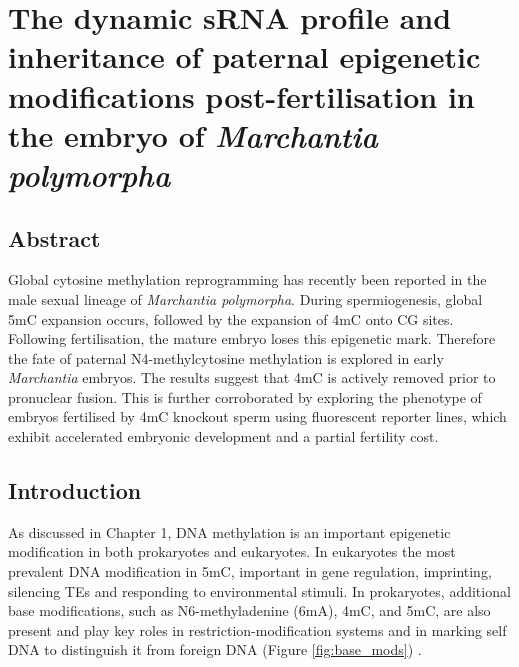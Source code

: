 \chapter{The dynamic sRNA profile and inheritance of paternal epigenetic modifications post-fertilisation in the embryo of \textit{Marchantia polymorpha}}

\ifpdf
    \graphicspath{{Chapter3/Figs/Raster/}{Chapter3/Figs/PDF/}{Chapter3/Figs/}}
\else
    \graphicspath{{Chapter3/Figs/Vector/}{Chapter3/Figs/}}
\fi


\section{Abstract}

Global cytosine methylation reprogramming has recently been reported in the male sexual lineage of \textit{Marchantia polymorpha}. During spermiogenesis, global 5mC expansion occurs, followed by the expansion of 4mC onto CG sites. Following fertilisation, the mature embryo loses this epigenetic mark. Therefore the fate of paternal N4-methylcytosine methylation is explored in early \textit{Marchantia} embryos. The results suggest that 4mC is actively removed prior to pronuclear fusion. This is further corroborated by exploring the phenotype of embryos fertilised by 4mC knockout sperm using fluorescent reporter lines, which exhibit accelerated embryonic development and a partial fertility cost.


\section{Introduction}

As discussed in Chapter 1, DNA methylation is an important epigenetic modification in both prokaryotes and eukaryotes. In eukaryotes the most prevalent DNA modification in 5mC, important in gene regulation, imprinting, silencing TEs and responding to environmental stimuli. In prokaryotes, additional base modifications, such as N6-methyladenine (6mA), 4mC, and 5mC, are also present and play key roles in restriction-modification systems and in marking self DNA to distinguish it from foreign DNA (Figure \ref{fig:base_mods}) \cite{RN309}.

